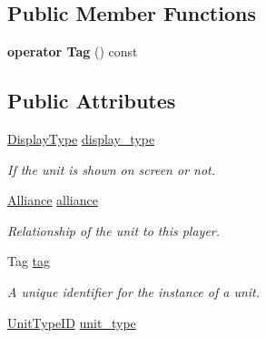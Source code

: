 \subsection*{Public Member Functions}
\begin{DoxyCompactItemize}
\item 
\mbox{\label{classsc2_1_1_unit_aca5722ffb5bc156d0e9d0b28a40fb7c1}} 
{\bfseries operator Tag} () const
\end{DoxyCompactItemize}
\subsection*{Public Attributes}
\begin{DoxyCompactItemize}
\item 
\mbox{\label{classsc2_1_1_unit_a37330a1811b5fe37894d13d8b8f000ac}} 
\hyperlink{classsc2_1_1_unit_af7815dad89107a05298c245b702ab270}{Display\+Type} \hyperlink{classsc2_1_1_unit_a37330a1811b5fe37894d13d8b8f000ac}{display\+\_\+type}
\begin{DoxyCompactList}\small\item\em If the unit is shown on screen or not. \end{DoxyCompactList}\item 
\mbox{\label{classsc2_1_1_unit_a639d0b3495e03ee28f5e91b16057d42b}} 
\hyperlink{classsc2_1_1_unit_a5a40e672e7599d73ef8ef5758bbd7461}{Alliance} \hyperlink{classsc2_1_1_unit_a639d0b3495e03ee28f5e91b16057d42b}{alliance}
\begin{DoxyCompactList}\small\item\em Relationship of the unit to this player. \end{DoxyCompactList}\item 
\mbox{\label{classsc2_1_1_unit_a1312ee20e783753ee8ddf054878f7d9f}} 
Tag \hyperlink{classsc2_1_1_unit_a1312ee20e783753ee8ddf054878f7d9f}{tag}
\begin{DoxyCompactList}\small\item\em A unique identifier for the instance of a unit. \end{DoxyCompactList}\item 
\mbox{\label{classsc2_1_1_unit_a4d7e26d2a7a33bc685fc3696dfed026f}} 
\hyperlink{classsc2_1_1_s_c2_type}{Unit\+Type\+ID} \hyperlink{classsc2_1_1_unit_a4d7e26d2a7a33bc685fc3696dfed026f}{unit\+\_\+type}

\end{DoxyCompactItemize}
